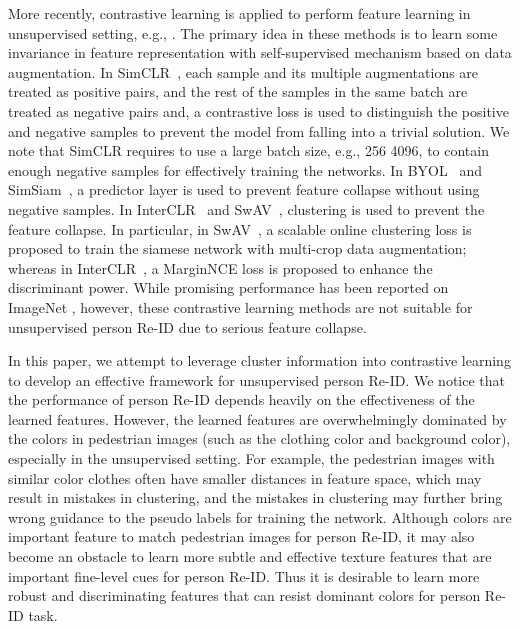 \documentclass[journal]{IEEEtran}
\def\eg{e.g.}
\begin{document}
More recently, contrastive learning is applied to perform feature learning in unsupervised setting, \eg, \cite{Xie:NIPS20, Caron:arxiv20, Chen:ICLR20, Chen:arxiv20, Larochelle:NIPS2020}. The primary idea in these methods is to learn some invariance in feature representation with self-supervised mechanism based on data augmentation. 
In SimCLR~\cite{Chen:ICLR20}, each sample and its multiple augmentations are treated as positive pairs, and the rest of the samples in the same batch are treated as negative pairs and,  a contrastive loss is used to distinguish the positive and negative samples to prevent the model from falling into a trivial solution. 
We note that SimCLR requires to use a large batch size, \eg, 256  4096, to contain enough negative samples for effectively training the networks.  
In BYOL~\cite{Larochelle:NIPS2020} and SimSiam~\cite{Chen:arxiv20}, a predictor layer is used to prevent feature collapse without using negative samples. 
In InterCLR~\cite{Xie:NIPS20} and SwAV~\cite{Caron:arxiv20}, clustering is used to prevent the feature collapse.
In particular, in SwAV~\cite{Caron:arxiv20}, a scalable online clustering loss is proposed to train the siamese network with multi-crop data augmentation; whereas in InterCLR~\cite{Xie:NIPS20}, a MarginNCE loss is proposed to enhance the discriminant power. 
While promising performance has been reported on ImageNet \cite{Krizhevsky:NIPS12}, however, these contrastive learning methods are not suitable for unsupervised person Re-ID due to serious feature collapse. 

In this paper, we attempt to leverage cluster information into contrastive learning to develop an effective framework for unsupervised person Re-ID. We notice that the performance of person Re-ID depends heavily on the effectiveness of the learned features. However, the learned features are overwhelmingly dominated by the colors in pedestrian images (such as the clothing color and background color), especially in the unsupervised setting. For example, the pedestrian images with similar color clothes often have smaller distances in feature space, which may result in mistakes in clustering, 
and the mistakes in clustering may further bring wrong guidance to the pseudo labels for training the network.  
Although colors are important feature to match pedestrian images for person Re-ID, it may also become an obstacle to learn more subtle and effective texture features that are important fine-level cues for person Re-ID. Thus it is desirable to learn more robust and discriminating features that can resist dominant colors for person Re-ID task. 
\end{document}
